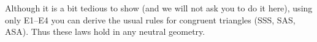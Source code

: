 \documentclass[instructornotes]{ximera}
\begin{document}




Although it is a bit tedious to show (and we will not ask you to do it
here), using only E1--E4 you can derive the usual rules for congruent
triangles (SSS, SAS, ASA). Thus these laws hold in any neutral
geometry.
\end{document}
